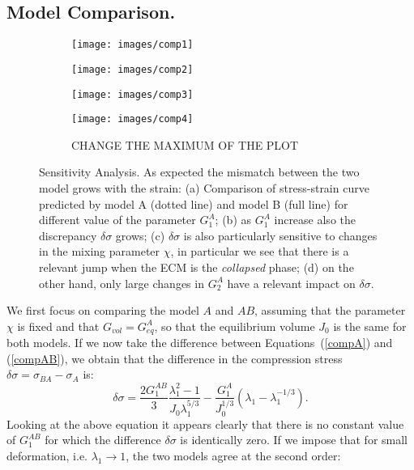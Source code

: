 \subsection{Model Comparison.}
\begin{figure}[h!]
	\begin{subfigure}{0.49\textwidth}
		\texttt{[image: images/comp1]}
		\caption{}
	\end{subfigure}
	\begin{subfigure}{0.49\textwidth}
		\texttt{[image: images/comp2]}
		\caption{}
	\end{subfigure}
	
	\begin{subfigure}{0.49\textwidth}
		\texttt{[image: images/comp3]}
		\caption{}
	\end{subfigure}
	\begin{subfigure}{0.49\textwidth}
		\texttt{[image: images/comp4]}
		\caption{CHANGE THE MAXIMUM OF THE PLOT}
	\end{subfigure}
	\caption{Sensitivity Analysis. As expected the mismatch between the two model grows with the strain: (a) Comparison of stress-strain curve predicted by model A (dotted line) and model B (full line) for different value of the parameter $G^A_1$; (b) as $G_1^A$ increase also the discrepancy $\delta\sigma$ grows; (c) $\delta\sigma$ is also particularly sensitive to changes in the mixing parameter $\chi$, in particular we see that there is a relevant jump when the ECM is the \textit{collapsed} phase; (d) on the other hand, only large changes in $G^A_2$ have a relevant impact on $\delta\sigma$.}
	\label{comp3}
\end{figure}
We first focus on comparing the model $A$ and $AB$, assuming that the parameter $\chi$ is fixed and that $G_{vol}=G^A_{eq}$, so that the equilibrium volume $J_0$ is the same for both models. If we now take the difference between Equations~(\ref{compA}) and (\ref{compAB}), we obtain that the difference in the compression stress $\delta \sigma= \sigma_{BA}-\sigma_{A}$ is:
\begin{equation}
\delta \sigma = \frac{2 G_1^{AB}}{3} \frac{\lambda_1^2-1}{J_0\lambda_1^{5/3}} - \frac{G_1^A}{J_0^{1/3}}(\lambda_1-\lambda_1^{-1/3}).\label{err}
\end{equation}
Looking at the above equation it appears clearly that there is no constant value of $G^{AB}_1$ for which the difference $\delta \sigma$ is identically zero. If we impose that for small deformation, i.e. $\lambda_1\rightarrow 1$, the two models agree at the second order:
